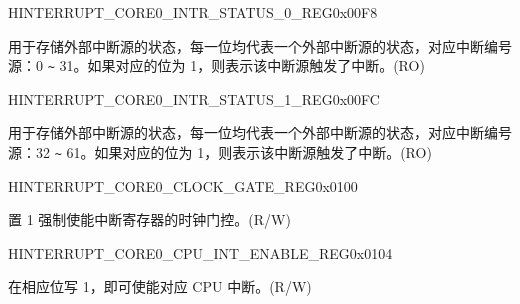 \begin{register}{H}{INTERRUPT\_CORE0\_INTR\_STATUS\_0\_REG}{0x00F8}\label{regdesc:INTERRUPTCORE0INTRSTATUS0REG}
%
\regnewline%
\begin{regdesc}\begin{reglist}
\label{fielddesc:INTERRUPTCORE0INTRSTATUS0}\item [INTERRUPT\_CORE0\_INTR\_STATUS\_0] 用于存储外部中断源的状态，每一位均代表一个外部中断源的状态，对应中断编号源：0 \verb+~+ 31。如果对应的位为 1，则表示该中断源触发了中断。(RO)
\end{reglist}\end{regdesc}
\end{register}


\begin{register}{H}{INTERRUPT\_CORE0\_INTR\_STATUS\_1\_REG}{0x00FC}\label{regdesc:INTERRUPTCORE0INTRSTATUS1REG}
%
\regnewline%
\begin{regdesc}\begin{reglist}
\label{fielddesc:INTERRUPTCORE0INTRSTATUS1}\item [INTERRUPT\_CORE0\_INTR\_STATUS\_1] 用于存储外部中断源的状态，每一位均代表一个外部中断源的状态，对应中断编号源：32 \verb+~+ 61。如果对应的位为 1，则表示该中断源触发了中断。(RO)
\end{reglist}\end{regdesc}
\end{register}


\begin{register}{H}{INTERRUPT\_CORE0\_CLOCK\_GATE\_REG}{0x0100}\label{regdesc:INTERRUPTCORE0CLOCKGATEREG}
%
%
\regnewline%
\begin{regdesc}\begin{reglist}
\label{fielddesc:INTERRUPTCORE0CLKEN}\item [INTERRUPT\_CORE0\_CLK\_EN] 置 1 强制使能中断寄存器的时钟门控。(R/W)
\end{reglist}\end{regdesc}
\end{register}


\begin{register}{H}{INTERRUPT\_CORE0\_CPU\_INT\_ENABLE\_REG}{0x0104}\label{regdesc:INTERRUPTCORE0CPUINTENABLEREG}
%
\regnewline%
\begin{regdesc}\begin{reglist}
\label{fielddesc:INTERRUPTCORE0CPUINTENABLE}\item [INTERRUPT\_CORE0\_CPU\_INT\_ENABLE] 在相应位写 1，即可使能对应 CPU 中断。(R/W)
\end{reglist}\end{regdesc}
\end{register}


